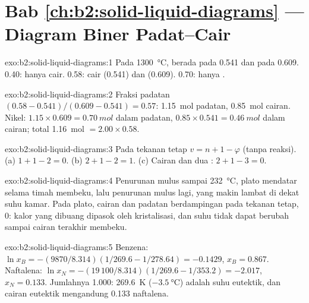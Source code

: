 \section*{Bab \ref{ch:b2:solid-liquid-diagrams} --- Diagram Biner Padat--Cair}

\begin{solution}{exo:b2:solid-liquid-diagrams:1}
Pada \qty{1300}{\degreeCelsius},  berada pada 0.541 dan 
pada 0.609. 0.40: hanya cair. 0.58: cair (0.541) dan 
(0.609). 0.70: hanya .
\end{solution}

\begin{solution}{exo:b2:solid-liquid-diagrams:2}
Fraksi padatan $(0.58 - 0.541)/(0.609 - 0.541) = 0.57$: \qty{1.15}{mol}
padatan, \qty{0.85}{mol} cairan. Nikel: $1.15 \times 0.609 = \qty{0.70}{mol}$
dalam padatan, $0.85 \times 0.541 = \qty{0.46}{mol}$ dalam cairan; total
\qty{1.16}{mol} $= 2.00 \times 0.58$.
\end{solution}

\begin{solution}{exo:b2:solid-liquid-diagrams:3}
Pada tekanan tetap $v = n + 1 - \varphi$ (tanpa reaksi). (a)
$1 + 1 - 2 = 0$. (b) $2 + 1 - 2 = 1$. (c) Cairan dan dua :
$2 + 1 - 3 = 0$.
\end{solution}

\begin{solution}{exo:b2:solid-liquid-diagrams:4}
Penurunan mulus sampai \qty{232}{\degreeCelsius}, plato mendatar selama
timah membeku, lalu penurunan mulus lagi, yang makin lambat di dekat suhu
kamar. Pada plato, cairan dan padatan berdampingan pada tekanan tetap,
 0: kalor yang dibuang dipasok oleh kristalisasi, dan suhu tidak
dapat berubah sampai cairan terakhir membeku.
\end{solution}

\begin{solution}{exo:b2:solid-liquid-diagrams:5}
Benzena: $\ln x_B = -(9870/8.314)(1/269.6 - 1/278.64) = -0.1429$, $x_B =
0.867$. Naftalena: $\ln x_N = -(19\,100/8.314)(1/269.6 - 1/353.2) = -2.017$,
$x_N = 0.133$. Jumlahnya 1.000: \qty{269.6}{K}
($\qty{-3.5}{\degreeCelsius}$) adalah suhu eutektik, dan cairan eutektik
mengandung 0.133 naftalena.
\end{solution}

